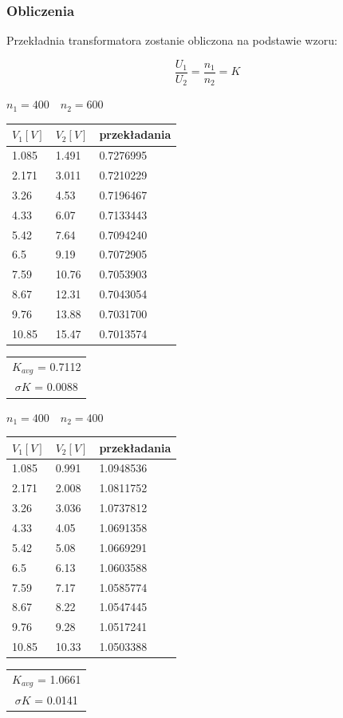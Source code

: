 \documentclass[a4paper, 11pt]{article}
\begin{document}
\subsubsection{Obliczenia}

Przekładnia transformatora zostanie obliczona na podstawie wzoru:

\[
	\frac{U_1}{U_2} = \frac{n_1}{n_2} = K
\]

\begin{multicols}{3}
	$n_1 = 400 \quad n_2 = 600$
	\begin{tabular}{l|l|l}
		\hline
		$V_1 [V]$ & $V_2 [V]$ & przekładania \\ \hline
		1.085     & 1.491     & 0.7276995    \\ \hline
		2.171     & 3.011     & 0.7210229    \\ \hline
		3.26      & 4.53      & 0.7196467    \\ \hline
		4.33      & 6.07      & 0.7133443    \\ \hline
		5.42      & 7.64      & 0.7094240    \\ \hline
		6.5       & 9.19      & 0.7072905    \\ \hline
		7.59      & 10.76     & 0.7053903    \\ \hline
		8.67      & 12.31     & 0.7043054    \\ \hline
		9.76      & 13.88     & 0.7031700    \\ \hline
		10.85     & 15.47     & 0.7013574    \\ \hline
	\end{tabular}
	\begin{tabular}{c}
		$K_{avg}$ = 0.7112 \\
		$\sigma K$ = 0.0088
	\end{tabular}



	\columnbreak
	$n_1 = 400 \quad n_2 = 400$
	\begin{tabular}{l|l|l}
		\hline
		$V_1 [V]$ & $V_2 [V]$ & przekładania \\ \hline
		1.085     & 0.991     & 1.0948536    \\ \hline
		2.171     & 2.008     & 1.0811752    \\ \hline
		3.26      & 3.036     & 1.0737812    \\ \hline
		4.33      & 4.05      & 1.0691358    \\ \hline
		5.42      & 5.08      & 1.0669291    \\ \hline
		6.5       & 6.13      & 1.0603588    \\ \hline
		7.59      & 7.17      & 1.0585774    \\ \hline
		8.67      & 8.22      & 1.0547445    \\ \hline
		9.76      & 9.28      & 1.0517241    \\ \hline
		10.85     & 10.33     & 1.0503388    \\ \hline
	\end{tabular}
	\begin{tabular}{c}
		$K_{avg}$ = 1.0661 \\
		$\sigma K$ = 0.0141
	\end{tabular}



\end{multicols}
\end{document}
